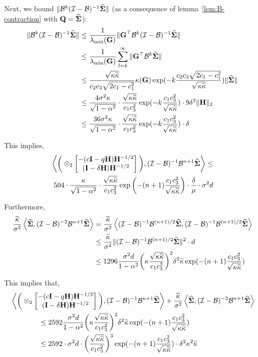Next, we bound $\|\mathcal{B}^k(\mathcal{I}-\mathcal{B})^{-1}\mathbf{\widehat{\Sigma}}\|$ (as a consequence of lemma~\ref{lem:B-contraction} with $\mathbf{Q}=\mathbf{\widehat{\Sigma}}$):
\begin{align*}
\|\mathcal{B}^k(\mathcal{I}-\mathcal{B})^{-1}\mathbf{\widehat{\Sigma}}\|&\leq\frac{1}{\lambda_{\min}(\mathbf{G})}\|\mathbf{G}^{\top}\mathcal{B}^k(\mathcal{I}-\mathcal{B})^{-1}\mathbf{\widehat{\Sigma}}\|\\
&\leq\frac{1}{\lambda_{\min}(\mathbf{G})}\sum_{l=k}^{\infty}\|\mathbf{G}^{\top}\mathcal{B}^k\mathbf{\widehat{\Sigma}}\|\\
&\leq\frac{\sqrt{{\kappa}\widetilde{\kappa}}}{c_2c_3\sqrt{2c_1-c_1^2}}\kappa(\mathbf{G})\exp({-k\frac{c_2c_3\sqrt{2c_1-c_1^2}}{\sqrt{{\kappa}\widetilde{\kappa}}}})\|\mathbf{\widehat{\Sigma}}\|\\
&\leq\frac{4\sigma^2{\kappa}}{\sqrt{1-\alpha^2}}\cdot\frac{\sqrt{{\kappa}\widetilde{\kappa}}}{c_1c_3^2}\exp({-k\frac{c_1c_3^2}{\sqrt{{\kappa}\widetilde{\kappa}}}})\cdot 9\delta^2\|\mathbf{H}\|_2\\
&\leq\frac{36\sigma^2{\kappa}}{\sqrt{1-\alpha^2}}\cdot\frac{\sqrt{{\kappa}\widetilde{\kappa}}}{c_1c_3^2}\exp({-k\frac{c_1c_3^2}{\sqrt{{\kappa}\widetilde{\kappa}}}})\cdot \delta
\end{align*}

This implies, 
\begin{align*}
\left\langle \bigg(\otimes_{2}\begin{bmatrix}-(c\mathbf{I}-q\mathbf{H})\mathbf{H}^{-1/2}\\(\mathbf{I}-\delta\mathbf{H})\mathbf{H}^{-1/2}\end{bmatrix}\bigg), (\mathcal{I}-\mathcal{B})^{-1}\mathcal{B}^{n+1}\mathbf{\widehat{\Sigma}} \right\rangle\leq\nonumber\\504\cdot\frac{{\kappa}}{\sqrt{1-\alpha^2}}\cdot\frac{\sqrt{{\kappa}\widetilde{\kappa}}}{c_1c_3^2}\exp\bigg({-(n+1)\frac{c_1c_3^2}{\sqrt{{\kappa}\widetilde{\kappa}}}}\bigg)\cdot \frac{\delta}{\mu}\cdot \sigma^2d
\end{align*}

Furthermore, 
\begin{align*}
\frac{\widetilde{\kappa}}{\sigma^2}\left\langle \mathbf{\widehat{\Sigma}}, (\mathcal{I}-\mathcal{B})^{-2}\mathcal{B}^{n+1}\mathbf{\widehat{\Sigma}} \right\rangle&=\frac{\widetilde{\kappa}}{\sigma^2}\left\langle (\mathcal{I}-\mathcal{B})^{-1}\mathcal{B}^{(n+1)/2}\mathbf{\widehat{\Sigma}}, (\mathcal{I}-\mathcal{B})^{-1}\mathcal{B}^{(n+1)/2}\mathbf{\widehat{\Sigma}} \right\rangle\\
&\leq\frac{\widetilde{\kappa}}{\sigma^2}\|(\mathcal{I}-\mathcal{B})^{-1}\mathcal{B}^{(n+1)/2}\mathbf{\widehat{\Sigma}}\|^2\cdot d\\
&\leq1296\frac{\sigma^2d}{1-\alpha^2}\bigg({\kappa}\frac{\sqrt{{\kappa}\widetilde{\kappa}}}{c_1c_3^2}\bigg)^2\delta^2\widetilde{\kappa}\exp({-(n+1)\frac{c_1c_3^2}{\sqrt{{\kappa}\widetilde{\kappa}}}})
\end{align*}

This implies that,
\begin{align}
\label{eq:e42}
&\left\langle \bigg(\otimes_{2}\begin{bmatrix}-(c\mathbf{I}-q\mathbf{H})\mathbf{H}^{-1/2}\\(\mathbf{I}-\delta\mathbf{H})\mathbf{H}^{-1/2}\end{bmatrix}\bigg), (\mathcal{I}-\mathcal{B})^{-1}\mathcal{B}^{n+1}\mathbf{\widehat{\Sigma}} \right\rangle+\frac{\widetilde{\kappa}}{\sigma^2}\left\langle \mathbf{\widehat{\Sigma}}, (\mathcal{I}-\mathcal{B})^{-2}\mathcal{B}^{n+1}\mathbf{\widehat{\Sigma}} \right\rangle\nonumber\\&\qquad\qquad\leq2592\frac{\sigma^2d}{1-\alpha^2}\bigg({\kappa}\frac{\sqrt{{\kappa}\widetilde{\kappa}}}{c_1c_3^2}\bigg)^2\delta^2\widetilde{\kappa}\exp({-(n+1)\frac{c_1c_3^2}{\sqrt{{\kappa}\widetilde{\kappa}}}})\nonumber\\
&\qquad\qquad\leq2592\cdot\sigma^2d\cdot\bigg(\frac{\sqrt{{\kappa}\widetilde{\kappa}}}{c_1c_3^2}\bigg)^3\exp({-(n+1)\frac{c_1c_3^2}{\sqrt{{\kappa}\widetilde{\kappa}}}})\cdot\delta^2{\kappa}^2\widetilde{\kappa}
\end{align}

